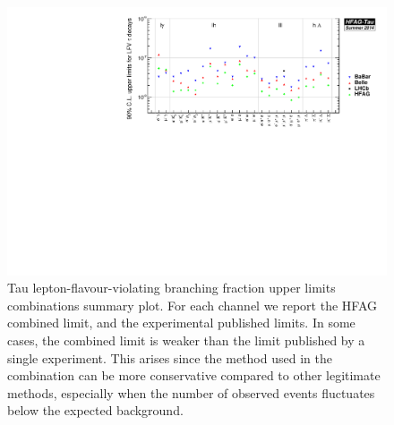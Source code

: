 \begin{figure}[tb]
  \begin{center}
    \includegraphics[angle=270,totalheight=0.86\textheight,clip]{TauLFV_combs.pdf}
    \caption{Tau lepton-flavour-violating branching fraction upper limits
      combinations summary plot. For each channel we report the HFAG
      combined limit, and the experimental published limits. In some cases,
      the combined limit is weaker than the limit published by a single
      experiment. This arises since the \cls method used in the
      combination can be more conservative compared to other legitimate
      methods, especially when the number of observed events fluctuates below the
      expected background. 
      \label{fig:tau:lfv-limits-plot-average}
    }
  \end{center}
\end{figure}
